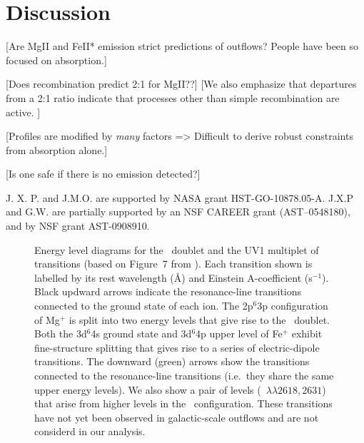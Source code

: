 \documentclass[12pt,preprint]{aastex}
\begin{document}
\section{Discussion}

[Are MgII and FeII* emission strict predictions of outflows?  People
have been so focused on absorption.]

[Does recombination predict 2:1 for MgII??]
[We also emphasize that departures from a 2:1
ratio indicate that processes other than simple recombination are
active. ]

[Profiles are modified by {\it many} factors => Difficult to derive
robust constraints from absorption alone.]

[Is one safe if there is no emission detected?]

\acknowledgments

J. X. P. and J.M.O. are supported by NASA grant
HST-GO-10878.05-A.  J.X.P and G.W. are partially supported
by an NSF CAREER grant (AST--0548180), and 
by NSF grant AST-0908910.

\clearpage

%
%



\clearpage







\begin{figure}
\caption{
Energy level diagrams for the \mgiid\ doublet and the UV1
multiplet of  transitions   
(based on Figure~7 from \cite{hmt+99}).
Each transition shown is
labelled by its rest wavelength (\AA) and Einstein A-coefficient
(s$^{-1}$). Black updward arrows
indicate the resonance-line transitions connected to the ground
state of each ion.  The 2p$^6$3p configuration of Mg$^+$ is split into
two energy levels that give rise to the \mgiid\ doublet.  
Both the 3d$^6$4s ground state and 3d$^6$4p upper level of Fe$^+$
exhibit fine-structure splitting that gives rise to a series of
electric-dipole transitions. 
The downward (green) arrows show the transitions connected to the
resonance-line transitions (i.e.\ they share the same upper energy
levels).  We also show a pair of levels (~$\lambda\lambda
2618,2631$) that arise from higher levels in the \zconfig\
configuration.  These transitions have not yet been observed in
galactic-scale outflows and are not considerd in our analysis.
}
\label{fig:energy}
\end{figure}
\end{document}
